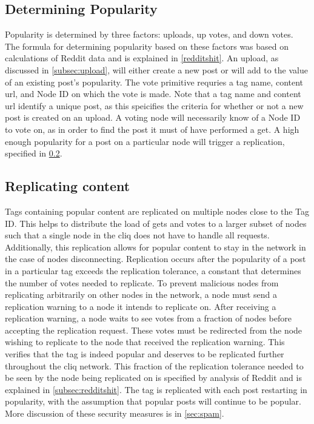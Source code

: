 \documentclass{sig-alternate}
\begin{document}
\subsection{Determining Popularity}
\label{subsec:popularity}

Popularity is determined by three factors: uploads, up votes, and down votes. 
The formula for determining popularity based on these factors was based on calculations of Reddit data and is explained in \ref{redditshit}.
An upload, as discussed in \ref{subsec:upload}, will either create a new post or will add to the value of an existing post's popularity. 
The vote primitive requries a tag name, content url, and Node ID on which the vote is made. 
Note that a tag name and content url identify a unique post, as this speicifies the criteria for whether or not a new post is created on an upload. 
A voting node will necessarily know of a Node ID to vote on, as in order to find the post it must of have performed a get. 
A high enough popularity for a post on a particular node will trigger a replication, specified in \ref{subsec:replication}. 

\subsection{Replicating content}
\label{subsec:replication}

Tags containing popular content are replicated on multiple nodes close to the Tag ID. 
This helps to distribute the load of gets and votes to a larger subset of nodes such that a single node in the cliq does not have to handle all requests. 
Additionally, this replication allows for popular content to stay in the network in the case of nodes disconnecting. 
Replication occurs after the popularity of a post in a particular tag exceeds the replication tolerance, a constant that determines the number of votes needed to replicate. 
To prevent malicious nodes from replicating arbitrarily on other nodes in the network, a node must send a replication warning to a node it intends to replicate on. 
After receiving a replication warning, a node waits to see votes from a fraction of nodes before accepting the replication request. 
These votes must be redirected from the node wishing to replicate to the node that received the replication warning. 
This verifies that the tag is indeed popular and deserves to be replicated further throughout the cliq network. 
This fraction of the replication tolerance needed to be seen by the node being replicated on is specified by analysis of Reddit and is explained in \ref{subsec:redditshit}. 
The tag is replicated with each post restarting in popularity, with the assumption that popular posts will continue to be popular. 
More discussion of these security measures is in \ref{sec:spam}. 
\end{document}
